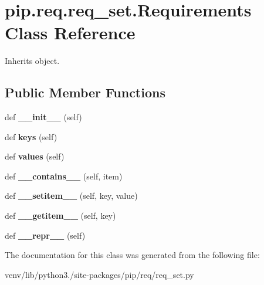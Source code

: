 \hypertarget{classpip_1_1req_1_1req__set_1_1_requirements}{}\section{pip.\+req.\+req\+\_\+set.\+Requirements Class Reference}
\label{classpip_1_1req_1_1req__set_1_1_requirements}


Inherits object.

\subsection*{Public Member Functions}
\begin{DoxyCompactItemize}
\item 
\mbox{\label{classpip_1_1req_1_1req__set_1_1_requirements_a72be75681ce88cad7123f107ade75c8d}} 
def {\bfseries \+\_\+\+\_\+init\+\_\+\+\_\+} (self)
\item 
\mbox{\label{classpip_1_1req_1_1req__set_1_1_requirements_a5910200a103855566a810c5c38a1ea85}} 
def {\bfseries keys} (self)
\item 
\mbox{\label{classpip_1_1req_1_1req__set_1_1_requirements_a68f9d94a673319da4677165d0a04ac6d}} 
def {\bfseries values} (self)
\item 
\mbox{\label{classpip_1_1req_1_1req__set_1_1_requirements_a15f01e265729f5eddffa861bda1c165c}} 
def {\bfseries \+\_\+\+\_\+contains\+\_\+\+\_\+} (self, item)
\item 
\mbox{\label{classpip_1_1req_1_1req__set_1_1_requirements_a7dd0b0a8c251f77a018f74356ba8c03a}} 
def {\bfseries \+\_\+\+\_\+setitem\+\_\+\+\_\+} (self, key, value)
\item 
\mbox{\label{classpip_1_1req_1_1req__set_1_1_requirements_adc117095f61776f93edde938f52f569a}} 
def {\bfseries \+\_\+\+\_\+getitem\+\_\+\+\_\+} (self, key)
\item 
\mbox{\label{classpip_1_1req_1_1req__set_1_1_requirements_a72cb9b72afc72ef8894a05d08d824a99}} 
def {\bfseries \+\_\+\+\_\+repr\+\_\+\+\_\+} (self)
\end{DoxyCompactItemize}


The documentation for this class was generated from the following file\+:\begin{DoxyCompactItemize}
\item 
venv/lib/python3./site-\/packages/pip/req/req\+\_\+set.\+py\end{DoxyCompactItemize}
